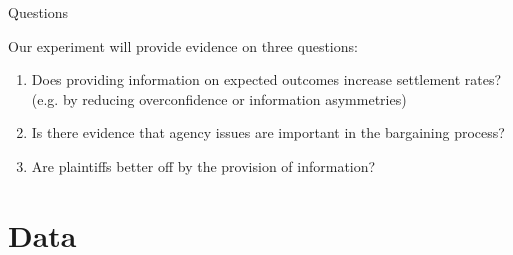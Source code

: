 \documentclass[9pt]{beamer}
\begin{document}
 




   
  
  


 

\begin{frame}{Questions}


\vspace{.1in}

Our experiment will provide evidence on three questions: 

\vspace{5mm}
\begin{enumerate}
      \item Does providing information on expected outcomes increase settlement rates? (e.g. by reducing  overconfidence or information asymmetries) 
      \vspace{2mm}
      \item Is there evidence that agency issues are important in the bargaining process?
      \vspace{2mm}
      \item Are plaintiffs better off by the provision of information? 
  \end{enumerate}
\end{frame}



\section{Data}
\end{document}
